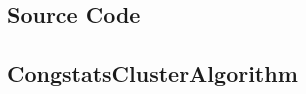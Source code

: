 \begin{appendices}
    \chapter{Source Code}
    
    \tocless\section{CongstatsClusterAlgorithm}
    
    
    
    
    
    \end{appendices}
    
